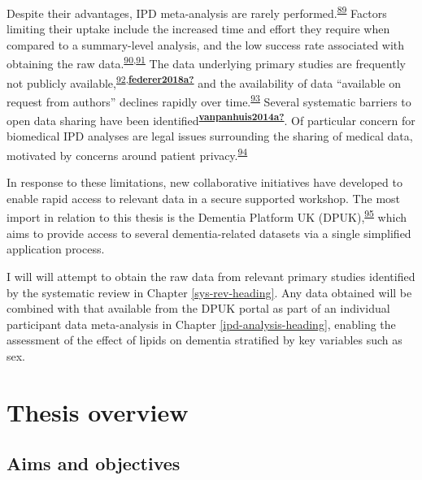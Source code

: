\documentclass[a4paper, twoside]{templates/ociamthesis}
\begin{document}
Despite their advantages, IPD meta-analysis are rarely performed.\textsuperscript{\protect\hyperlink{ref-tugwell2010}{89}} Factors limiting their uptake include the increased time and effort they require when compared to a summary-level analysis, and the low success rate associated with obtaining the raw data.\textsuperscript{\protect\hyperlink{ref-nevitt2017a}{90},\protect\hyperlink{ref-ventresca2020}{91}} The data underlying primary studies are frequently not publicly available,\textsuperscript{\protect\hyperlink{ref-alsheikh-ali2011}{92},\protect\hyperlink{ref-federer2018a}{\textbf{federer2018a?}}} and the availability of data ``available on request from authors'' declines rapidly over time.\textsuperscript{\protect\hyperlink{ref-vines2014}{93}} Several systematic barriers to open data sharing have been identified\textsuperscript{\protect\hyperlink{ref-vanpanhuis2014a}{\textbf{vanpanhuis2014a?}}}. Of particular concern for biomedical IPD analyses are legal issues surrounding the sharing of medical data, motivated by concerns around patient privacy.\textsuperscript{\protect\hyperlink{ref-wartenberg2010}{94}}

In response to these limitations, new collaborative initiatives have developed to enable rapid access to relevant data in a secure supported workshop. The most import in relation to this thesis is the Dementia Platform UK (DPUK),\textsuperscript{\protect\hyperlink{ref-bauermeister2020}{95}} which aims to provide access to several dementia-related datasets via a single simplified application process.

I will will attempt to obtain the raw data from relevant primary studies identified by the systematic review in Chapter \ref{sys-rev-heading}. Any data obtained will be combined with that available from the DPUK portal as part of an individual participant data meta-analysis in Chapter \ref{ipd-analysis-heading}, enabling the assessment of the effect of lipids on dementia stratified by key variables such as sex.

\hypertarget{thesis-overview}{%
\section{Thesis overview}\label{thesis-overview}}

\hypertarget{aims-and-objectives}{%
\subsection{Aims and objectives}\label{aims-and-objectives}}
\end{document}
